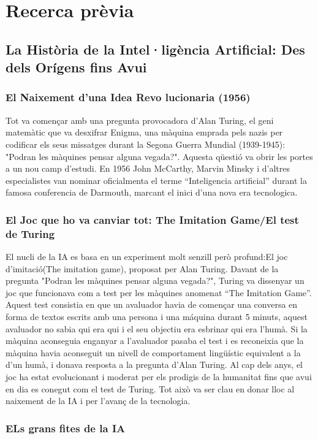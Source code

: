 \chapter{Recerca prèvia}
\label{c:intro}
\section{La Història de la Intel·ligència Artificial: Des dels Orígens fins Avui}
\subsection{El Naixement d'una Idea Revo lucionaria (1956)}
Tot va començar amb una pregunta provocadora d’Alan Turing, el geni matemàtic que va desxifrar Enigma, una màquina emprada pels nazis per codificar els seus missatges durant la Segona Guerra Mundial (1939-1945): "Podran les màquines pensar alguna vegada?". Aquesta qüestió va obrir les portes a un nou camp d’estudi. En 1956 John McCarthy, Marvin Minsky i d'altres especialistes van nominar oficialmenta el terme ``Inteligencia artificial'' durant la famosa conferencia de Darmouth, marcant el inici d'una nova era tecnologica.
\subsection{El Joc que ho va canviar tot: The Imitation Game/El test de Turing}
El nucli de la IA es basa en un experiment molt senzill però profund:El joc d'imitació(The imitation game), proposat per Alan Turing. Davant de la pregunta "Podran les màquines pensar alguna vegada?", Turing va dissenyar un joc que funcionava com a test per les màquines anomenat ``The Imitation Game''. Aquest test consistia en que un avaluador havia de començar una conversa en forma de textos escrits amb una persona i una máquina durant 5 minuts, aquest avaluador no sabia qui era qui i el seu objectiu era esbrinar qui era l'humà. Si la màquina aconseguia enganyar a l'avaluador pasaba el test i es reconeixia que la màquina havia aconseguit un nivell de comportament lingüístic equivalent a la d'un humà, i donava resposta a la pregunta d'Alan Turing. Al cap dels anys, el joc ha estat evolucionant i moderat per els prodigis de la humanitat fins que avui en dia es conegut com el test de Turing. Tot això va ser clau en  donar lloc al naixement de la IA i per l'avanç de la tecnologia.
\subsection{ELs grans fites de la IA}
